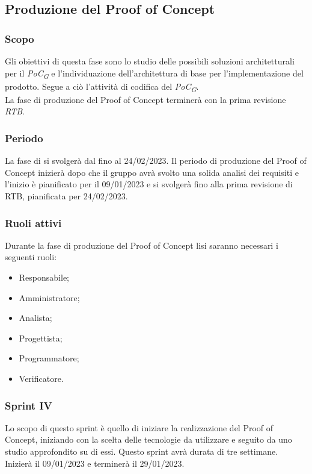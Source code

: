 \subsection{Produzione del Proof of Concept}
\subsubsection{Scopo}
Gli obiettivi di questa fase sono lo studio delle possibili soluzioni architetturali per il \textit{PoC\textsubscript{G}} e l’individuazione dell’architettura di base per l’implementazione del prodotto. Segue a ciò l’attività di codifica del \textit{PoC\textsubscript{G}}.\\
La fase di produzione del Proof of Concept terminerà con la prima revisione \textit{RTB}.

\subsubsection{Periodo}
La fase di  si svolgerà dal  fino al 24/02/2023.
Il periodo di produzione del Proof of Concept inizierà dopo che il gruppo avrà svolto una solida analisi dei requisiti e l'inizio è pianificato per il 09/01/2023 e si svolgerà fino alla prima revisione di RTB, pianificata per 24/02/2023.

\subsubsection{Ruoli attivi}
Durante la fase di produzione del Proof of Concept lisi saranno necessari i seguenti ruoli:
\begin{itemize}
	\item Responsabile;
    \item Amministratore;
    \item Analista;
    \item Progettista;
    \item Programmatore;
    \item Verificatore.
\end{itemize}

\subsubsection{Sprint IV}
Lo scopo di questo sprint è quello di iniziare la realizzazione del Proof of Concept, iniziando con la scelta delle tecnologie da utilizzare e seguito da uno studio approfondito su di essi.
Questo sprint avrà durata di tre settimane. Inizierà il 09/01/2023 e terminerà il 29/01/2023.


